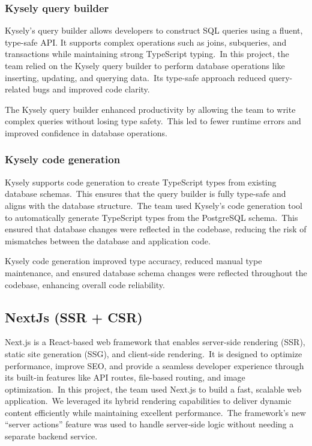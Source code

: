 

\subsubsection{Kysely query builder}\label{subsubsec:kysely-query-builder}

Kysely's query builder allows developers to construct SQL queries using a fluent, type-safe API. It supports complex operations such as joins, subqueries, and transactions while maintaining strong TypeScript typing.\ In this project, the team relied on the Kysely query builder to perform database operations like inserting, updating, and querying data.\ Its type-safe approach reduced query-related bugs and improved code clarity.

The Kysely query builder enhanced productivity by allowing the team to write complex queries without losing type safety.\ This led to fewer runtime errors and improved confidence in database operations.



\subsubsection{Kysely code generation}\label{subsubsec:kysely-code-generation}

Kysely supports code generation to create TypeScript types from existing database schemas.\ This ensures that the query builder is fully type-safe and aligns with the database structure.\ The team used Kysely's code generation tool to automatically generate TypeScript types from the PostgreSQL schema.\ This ensured that database changes were reflected in the codebase, reducing the risk of mismatches between the database and application code.

Kysely code generation improved type accuracy, reduced manual type maintenance, and ensured database schema changes were reflected throughout the codebase, enhancing overall code reliability.



\subsection{NextJs (SSR + CSR)}\label{subsec:nextjs-(ssr-+-csr)}

Next.js is a React-based web framework that enables server-side rendering (SSR), static site generation (SSG), and client-side rendering.\ It is designed to optimize performance, improve SEO, and provide a seamless developer experience through its built-in features like API routes, file-based routing, and image optimization.\ In this project, the team used Next.js to build a fast, scalable web application.\ We leveraged its hybrid rendering capabilities to deliver dynamic content efficiently while maintaining excellent performance.\ The framework’s new ``server actions'' feature was used to handle server-side logic without needing a separate backend service.\cite[Next.js]{nextjs}

